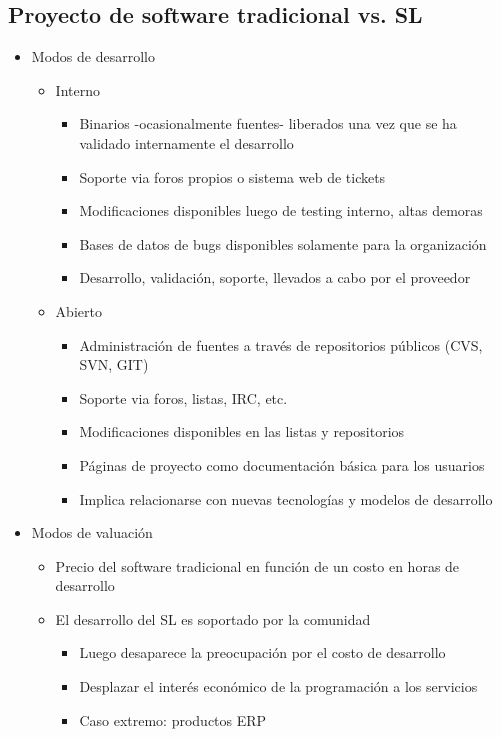 \subsection {Proyecto de software tradicional vs. SL}
\begin{itemize}
\item Modos de desarrollo
	\begin{itemize}
	\item Interno
		\begin{itemize}
		\item Binarios -ocasionalmente fuentes- liberados una vez que se ha validado internamente el desarrollo
		\item Soporte via foros propios o sistema web de tickets
		\item Modificaciones disponibles luego de testing interno, altas demoras
		\item Bases de datos de bugs disponibles solamente para la organización
		\item Desarrollo, validación, soporte, llevados a cabo por el proveedor
		\end{itemize}
	\item Abierto
		\begin{itemize}
		\item Administración de fuentes a través de repositorios públicos (CVS, SVN, GIT)
		\item Soporte via foros, listas, IRC, etc.
		\item Modificaciones disponibles en las listas y repositorios
		\item Páginas de proyecto como documentación básica para los usuarios
		\item Implica relacionarse con nuevas tecnologías y modelos de desarrollo
		\end{itemize}
	\end{itemize}
\item Modos de valuación
	\begin{itemize}
	\item Precio del software tradicional en función de un costo en horas de desarrollo
	\item El desarrollo del SL es soportado por la comunidad
		\begin{itemize}
		\item Luego desaparece la preocupación por el costo de desarrollo
		\item Desplazar el interés económico de la programación a los servicios
		\item Caso extremo: productos ERP
		\end{itemize}
	\end{itemize}
\end{itemize}

